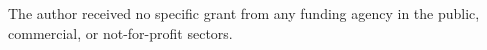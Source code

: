 The author received no specific grant from any funding agency in the public, commercial, or not-for-profit sectors.
